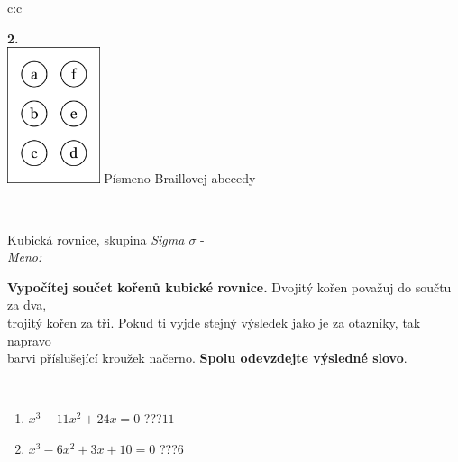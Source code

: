 \documentclass[10pt]{report}
\begin{document}
\begin{tabular}{c:c}
\begin{minipage}[c][104.5mm][t]{0.5\linewidth}
\begin{center}
\begin{minipage}{0.79\linewidth}
\begin{center}
\begin{varwidth}{\linewidth}
\begin{enumerate}
\end{enumerate}
\end{varwidth}
\end{center}
\end{minipage}
\begin{minipage}{0.20\linewidth}
\begin{center}
{\Huge\bfseries 2.} \\[2mm]
\includegraphics[height=40mm]{../images/braille.png}
{\small Písmeno Braillovej abecedy}
\end{center}
\end{minipage}
\end{center}
\end{minipage}
\\ \hdashline
\begin{minipage}[c][104.5mm][t]{0.5\linewidth}
\begin{center}
\vspace{7mm}
{\huge Kubická rovnice, skupina \textit{Sigma $\sigma$} -}\\[5mm]
\textit{Meno:}\phantom{xxxxxxxxxxxxxxxxxxxxxxxxxxxxxxxxxxxxxxxxxxxxxxxxxxxxxxxxxxxxxxxxx}\\[5mm]
\begin{minipage}{0.95\linewidth}
\textbf{Vypočítej součet kořenů kubické rovnice.} Dvojitý kořen považuj do součtu za dva,\\trojitý kořen za tři. Pokud ti vyjde stejný výsledek jako je za otazníky, tak napravo\\barvi příslušející kroužek načerno. \textbf{Spolu odevzdejte výsledné slovo}.
\end{minipage}
\\[1mm]
\begin{minipage}{0.79\linewidth}
\begin{center}
\begin{varwidth}{\linewidth}
\begin{enumerate}
\Large
\item $x^3-11x^2+24x=0$\quad \dotfill\; ???\;\dotfill \quad $11$
\item $x^3-6x^2+3x+10=0$\quad \dotfill\; ???\;\dotfill \quad $6$

\end{enumerate}
\end{varwidth}
\end{center}
\end{minipage}
\end{center}
\end{minipage}
\end{tabular}
\end{document}
